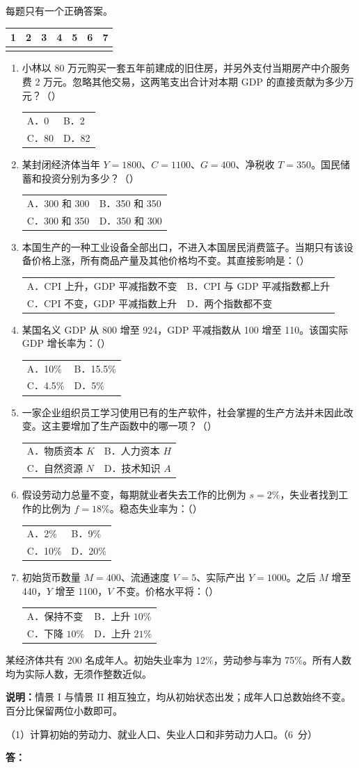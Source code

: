 \documentclass[UTF8,11pt,a4paper,fontset=fandol]{ctexart}
\makeatletter
\newcommand{\sect}[1]{\par\vspace{0.7em}{\large\bfseries #1}\par\vspace{0.6em}}
\newcommand{\choices}[4]{\par\nopagebreak\begin{tabularx}{\linewidth}{@{}XX@{}}A．#1&B．#2\\C．#3&D．#4\end{tabularx}\par}
\makeatother
\begin{document}
\newpage\sect{二、单选题（每题 4 分，共 28 分）}每题只有一个正确答案。
\par\smallskip\begin{tabularx}{\linewidth}{|*{7}{Y|}}&2&3&4&5&6&7\\\hline
\rule{0pt}{2.0em}&&&&&&\\\hline
\end{tabularx}\par\smallskip
\begin{enumerate}[label=\arabic*.,leftmargin=*,itemsep=0.85em,topsep=0.3em]
\item 小林以 80 万元购买一套五年前建成的旧住房，并另外支付当期房产中介服务费 2 万元。忽略其他交易，这两笔支出合计对本期 GDP 的直接贡献为多少万元？（\quad）
\choices{0}{2}{80}{82}
\item 某封闭经济体当年 $Y=1800$、$C=1100$、$G=400$、净税收 $T=350$。国民储蓄和投资分别为多少？（\quad）
\choices{300 和 300}{350 和 350}{300 和 350}{350 和 300}
\item 本国生产的一种工业设备全部出口，不进入本国居民消费篮子。当期只有该设备价格上涨，所有商品产量及其他价格均不变。其直接影响是：（\quad）
\choices{CPI 上升，GDP 平减指数不变}{CPI 与 GDP 平减指数都上升}{CPI 不变，GDP 平减指数上升}{两个指数都不变}
\item 某国名义 GDP 从 800 增至 924，GDP 平减指数从 100 增至 110。该国实际 GDP 增长率为：（\quad）
\choices{10\%}{15.5\%}{4.5\%}{5\%}
\item 一家企业组织员工学习使用已有的生产软件，社会掌握的生产方法并未因此改变。这主要增加了生产函数中的哪一项？（\quad）
\choices{物质资本 $K$}{人力资本 $H$}{自然资源 $N$}{技术知识 $A$}
\item 假设劳动力总量不变，每期就业者失去工作的比例为 $s=2\%$，失业者找到工作的比例为 $f=18\%$。稳态失业率为：（\quad）
\choices{2\%}{9\%}{10\%}{20\%}
\item 初始货币数量 $M=400$、流通速度 $V=5$、实际产出 $Y=1000$。之后 $M$ 增至 440，$Y$ 增至 1100，$V$ 不变。价格水平将：（\quad）
\choices{保持不变}{上升 $10\%$}{下降 $10\%$}{上升 $21\%$}
\end{enumerate}
\newpage\sect{三、计算题（1 题，共 20 分）}
某经济体共有 200 名成年人。初始失业率为 12\%，劳动参与率为 75\%。所有人数均为实际人数，无须作整数近似。

\textbf{说明：}情景 I 与情景 II 相互独立，均从初始状态出发；成年人口总数始终不变。百分比保留两位小数即可。

（1）计算初始的劳动力、就业人口、失业人口和非劳动力人口。\hfill\mbox{（6 分）}
\par\vspace{0.4em}\textbf{答：}\par\vfill
\end{document}
